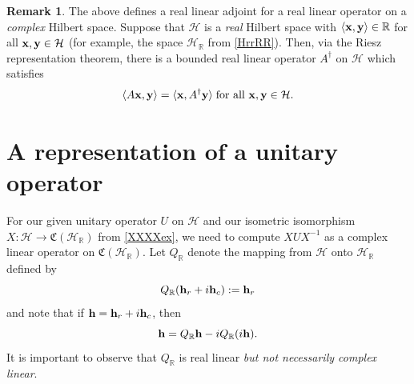 \documentclass{dis}
\theoremstyle{plain}
\theoremstyle{definition}
\newtheorem{Remark}[equation]{Remark}
\def\R{\mathbb{R}}
\newcommand{\h}{\mathcal{H}}
\renewcommand{\vec}[1]{{\bf #1}}
\newcommand{\0}{{\color{lightgray}0}}
\begin{document}
 \begin{Remark}\label{reasaalalalalll}
 The above defines a real linear adjoint for a real linear operator on a {\em complex} Hilbert space. 
 Suppose that  $\mathcal{H}$ is a {\em real} Hilbert space with $\langle \vec{x}, \vec{y}\rangle \in \R$ for all $\vec{x}, \vec{y} \in \mathcal{H}$ (for example, the space $\mathcal{H}_{\R}$ from \eqref{HrrRR}). Then, via the Riesz representation theorem, there is a bounded real linear operator $A^{\dagger}$ on $\mathcal{H}$ which satisfies 
 $$\langle A \vec{x}, \vec{y}\rangle =  \langle \vec{x}, A^{\dagger} \vec{y}\rangle \; \mbox{for all $\vec{x}, \vec{y} \in \mathcal{H}$}.$$ 
 \end{Remark}

\section{A representation of a unitary operator}


For our given unitary operator $U$ on $\mathcal{H}$ and our isometric isomorphism $X: \mathcal{H} \to \mathfrak{C}(\mathcal{H}_{\R})$ from \eqref{XXXXex}, we need to compute $X U X^{-1}$ as a complex linear operator on $\mathfrak{C}(\mathcal{H}_{\R})$. Let
 $Q_\R$ denote the mapping from $\mathcal{H}$ onto  $\h_\R$ defined by
 \begin{equation}\label{QqqrrrRR}
Q_\R (\vec{h}_r + i \vec{h}_c) : =\vec{h}_r
\end{equation} and note that if $\vec{h} = \vec{h}_r + i \vec{h}_c$, then
\begin{equation}\label{QqqqQ}
\vec{h}=Q_\R \vec{h}-iQ_\R(i \vec{h}).
\end{equation}
It is important to observe that $Q_{\R}$ is real linear {\em but not necessarily complex linear}.
\end{document}

